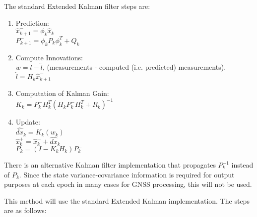 \documentclass[letterpaper,11pt]{article}
\begin{document}
The standard Extended Kalman filter steps are:

\begin{enumerate}
  \item Prediction: \\
         $ \hat{x}_{k+1}^- = \phi_k \hat{x}_{k} $ \\
         $ P_{k+1}^- = \phi_k P_k \phi_k^T + Q_k $
  \item Compute Innovations: \\
         $ w = l-\hat{l} $, (measurements - computed (i.e. predicted) measurements). \\
         $ \hat{l} = H_k \hat{x}_{k+1}^- $
  \item Computation of Kalman Gain: \\
         $ K_k = P_k^- H_k^T ( H_k P_k^- H_k^T + R_k ) ^{-1} $
  \item Update: \\
         $ \widehat{dx}_k = K_k(w_k) $\\
         $ \hat{x}_k^+ = \hat{x}_k^- + \widehat{dx}_k $ \\
         $ P_k = (I-K_k H_k) P_k^- $
\end{enumerate}

There is an alternative Kalman filter implementation that propagates $P_k^{-1}$ instead of $P_k$. Since the state variance-covariance information is required for output purposes at each epoch in many cases for GNSS processing, this will not be used.

\pagebreak

This method will use the standard Extended Kalman implementation. The steps are as follows:
\end{document}
